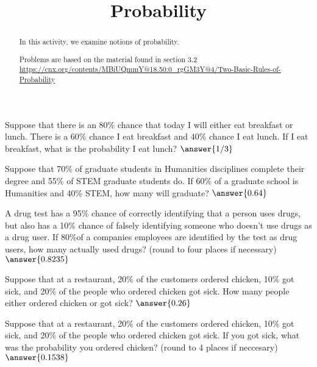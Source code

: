 \documentclass{ximera}
\title{Probability}
\begin{document}
      
\begin{abstract}
      
In this activity, we examine notions of probability.

Problems are based on the material found in section 3.2 \url{https://cnx.org/contents/MBiUQmmY@18.50:0_rgGM3Y@4/Two-Basic-Rules-of-Probability}
      
\end{abstract}
      
\maketitle
 
\begin{problem}
Suppose that there is an 80\% chance that today I will either eat breakfast or lunch.  There is a 60\% chance I eat breakfast and 40\% chance I eat lunch.  If I eat breakfast, what is the probability I eat lunch?  $\answer{1/3}$
\end{problem}

\begin{problem}
Suppose that 70\% of graduate students in Humanities disciplines complete their degree and 55\% of STEM graduate students do.  If 60\% of a graduate school is Humanities and 40\% STEM, how many will graduate?  $\answer{0.64}$
\end{problem}

\begin{problem}
A drug test has a 95\% chance of correctly identifying that a person uses drugs, but also has a 10\% chance of falsely identifying someone who doesn't use drugs as a drug user.  If 80\%of a companies employees are identified by the test as drug users, how many actually used drugs? (round to four places if necessary) $\answer{0.8235}$
\end{problem}


\begin{problem}
Suppose that at a restaurant, 20\% of the customers ordered chicken, 10\% got sick, and 20\% of the people who ordered chicken got sick.  How many people either ordered chicken or got sick? $\answer{0.26}$
\end{problem}

\begin{problem}
Suppose that at a restaurant, 20\% of the customers ordered chicken, 10\% got sick, and 20\% of the people who ordered chicken got sick.  If you got sick, what was the probability you ordered chicken? (round to 4 places if neccesary) $\answer{0.1538}$
\end{problem}
\end{document}
